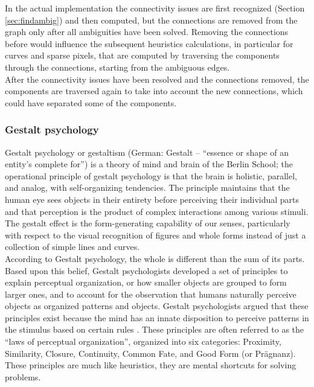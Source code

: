 \documentclass[]{usiinfbachelorproject}
\begin{document}
\noindent In the actual implementation the connectivity issues are first recognized (Section \ref{sec:findambig}) and then computed, but the connections are removed from the graph only after all ambiguities have been solved. Removing the connections before would influence the subsequent heuristics calculations, in particular for curves and sparse pixels, that are computed by traversing the components through the connections, starting from the ambiguous edges. \\
After the connectivity issues have been resolved and the connections removed, the components are traversed again to take into account the new connections, which could have separated some of the components.

\subsubsection{Gestalt psychology} \label{sec:gestalt}

Gestalt psychology or gestaltism (German: Gestalt -- ``essence or shape of an entity's complete for'') is a theory of mind and brain of the Berlin School; the operational principle of gestalt psychology is that the brain is holistic, parallel, and analog, with self-organizing tendencies. The principle maintains that the human eye sees objects in their entirety before perceiving their individual parts and that perception is the product of complex interactions among various stimuli. The gestalt effect is the form-generating capability of our senses, particularly with respect to the visual recognition of figures and whole forms instead of just a collection of simple lines and curves.\\
According to Gestalt psychology, the whole is different than the sum of its parts. Based upon this belief, Gestalt psychologists developed a set of principles to explain perceptual organization, or how smaller objects are grouped to form larger ones, and to account for the observation that humans naturally perceive objects as organized patterns and objects. Gestalt psychologists argued that these principles exist because the mind has an innate disposition to perceive patterns in the stimulus based on certain rules \cite{Gray2006}. These principles are often referred to as the ``laws of perceptual organization'', organized into six categories: Proximity, Similarity, Closure, Continuity, Common Fate, and Good Form (or Pr\"agnanz). These principles are much like heuristics, they are mental shortcuts for solving problems.\\
\end{document}

